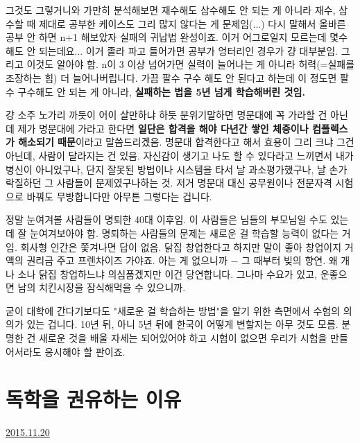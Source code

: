 그것도 그렇거니와 가만히 분석해보면 재수해도 삼수해도 안 되는 게 아니라
재수, 삼수할 때 제대로 공부한 케이스도 그리 많지 않다는 게 문제임(...)
다시 말해서 올바른 공부 안 하면 n+1 해보았자 실패의 귀납법 완성이죠.
이거 어그로일지 모르는데 몇수 해도 안 되는데요... 이거 졸라 파고 들어가면 공부가 엉터리인 경우가 걍 대부분임.
그리고 이것도 알아야 함. n이 3 이상 넘어가면 실력이 늘어나는 게 아니라 허력(=실패를 조장하는 힘) 더 늘어나버립니다.
가끔 팔수 구수 해도 안 된다고 하는데 이 정도면 팔수 구수해도 안 되는 게 아니라, \textbf{실패하는 법을 5년 넘게 학습해버린 것임.}
\vspace{5mm}

걍 소주 노가리 까듯이 어이 살만하냐 하듯 분위기말하면 명문대에 꼭 가라할 건 아닌데
제가 명문대에 가라고 한다면 \textbf{일단은 합격을 해야 다년간 쌓인 체증이나 컴플렉스가 해소되기 때문}이라고 말씀드리겠음.
명문대 합격한다고 해서 효용이 그리 크냐 그건 아닌데, 사람이 달라지는 건 있음. 자신감이 생기고 나도 할 수 있다라고 느끼면서
내가 병신이 아니었구나, 단지 잘못된 방법이나 시스템을 타서 날 과소평가했구나, 날 손가락질하던 그 사람들이 문제였구나하는 것.
저거 명문대 대신 공무원이나 전문자격 시험으로 바꿔도 무방합니다만 아무튼 그렇다는 겁니다.
\vspace{5mm}

정말 눈여겨볼 사람들이 명퇴한 40대 이후임. 이 사람들은 님들의 부모님일 수도 있는데 잘 눈여겨보아야 함.
명퇴하는 사람들의 문제는 새로운 걸 학습할 능력이 없다는 거임. 회사형 인간은 쫓겨나면 답이 없음.
닭집 창업한다고 하지만 말이 좋아 창업이지 거액의 권리금 주고 프렌차이즈 가야죠. 아는 게 없으니까 $-$ 그 때부터 빚의 향연.
왜 개나 소나 닭집 창업하느냐 의심품겠지만 이건 당연합니다. 그나마 수요가 있고, 운좋으면 남의 치킨시장을 잠식해먹을 수 있으니까.
\vspace{5mm}

굳이 대학에 간다기보다도 "새로운 걸 학습하는 방법"을 알기 위한 측면에서 수험의 의의가 있는 겁니다.
10년 뒤, 아니 5년 뒤에 한국이 어떻게 변할지는 아무 것도 모름. 분명한 건 새로운 것을 배울 자세는 되어있어야 하고
시험이 없으면 우리가 시험을 만들어서라도 응시해야 할 판이죠.
\vspace{5mm}






\section{독학을 권유하는 이유}
\href{https://www.kockoc.com/Apoc/502091}{2015.11.20}

\vspace{5mm}

